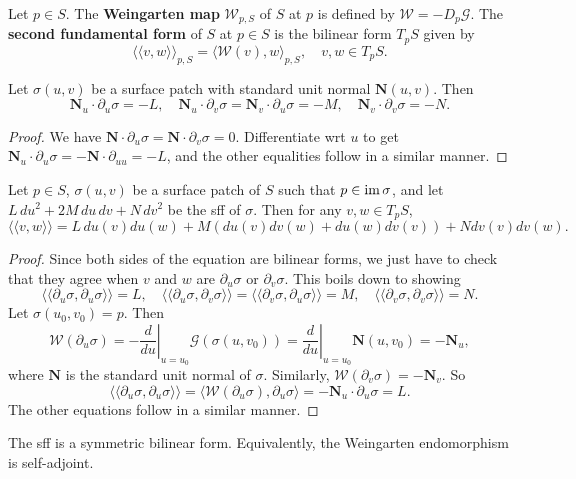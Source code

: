 \begin{definition}[]
    Let $p \in S$. The \textbf{Weingarten map} $\mathcal{W} _{p,S}$ of $S$ at $p$ is defined by $\mathcal{W}=-D_p \mathcal{G} $. The \textbf{second fundamental form} of $S$ at $p \in S$ is the bilinear form $T_p S$ given by \[
        \langle \langle v,w \rangle  \rangle _{p,S}=\langle \mathcal{W}(v),w \rangle  _{p,S}, \quad v,w  \in T_pS.
    \] 
\end{definition}
\begin{lemma}
    Let $\sigma(u,v)$ be a surface patch with standard unit normal $\mathbf N(u,v)$. Then \[
    \mathbf N_u \cdot \partial _u\sigma=-L,\quad \mathbf N_u \cdot \partial _v\sigma=\mathbf N_v \cdot \partial _u\sigma=-M,\quad \mathbf N_v \cdot \partial _v\sigma=-N.
    \] 
\end{lemma}
\begin{proof}
    We have $\mathbf N \cdot \partial _u\sigma =\mathbf N\cdot \partial _v\sigma=0$. Differentiate wrt $u$ to get $\mathbf N_u \cdot \partial _u\sigma = -\mathbf N \cdot \partial _{uu}=-L$, and the other equalities follow in a similar manner.
\end{proof}
\begin{prop}
    Let $p \in S$, $\sigma(u,v)$ be a surface patch of $S$ such that $p \in \operatorname{im} \sigma$, and let $L \,du^2+2M \,du\,dv+N\,dv^2$ be the sff of $\sigma$. Then for any $v,w \in T_p S$, \[
        \langle \langle v,w \rangle  \rangle =L\, du(v)du(w)+M(du(v)dv(w)+du(w)dv(v))+Ndv(v)dv(w).
    \] 
\end{prop}
\begin{proof}
    Since both sides of the equation are bilinear forms, we just have to check that they agree when $v$ and $w$ are $\partial _u\sigma$ or $\partial _v\sigma$. This boils down to showing \[
        \langle \langle \partial _u\sigma,\partial _u\sigma \rangle  \rangle =L,\quad \langle \langle \partial _u\sigma ,\partial _v\sigma \rangle  \rangle =\langle \langle \partial _v\sigma,\partial _u\sigma \rangle  \rangle =M,\quad \langle \langle \partial _v\sigma,\partial _v\sigma \rangle  \rangle =N.
    \] Let $\sigma(u_0,v_0)=p$. Then \[
    \mathcal{W} (\partial _u\sigma)= \left. -\frac{d}{du} \right| _{u=u_0} \mathcal{G} (\sigma(u,v_0))=\left. \frac{d}{du} \right| _{u=u_0}\mathbf N(u,v_0)=-\mathbf N_u,
        \] where $\mathbf N$ is the standard unit normal of $\sigma$. Similarly, $\mathcal{W} (\partial _v\sigma)=-\mathbf N_v$. So \[
        \langle \langle \partial _u\sigma,\partial _u\sigma \rangle  \rangle = \langle \mathcal{W} (\partial _u\sigma),\partial _u\sigma \rangle =-\mathbf N_u \cdot \partial _u\sigma=L.
        \] The other equations follow in a similar manner.
\end{proof}
\begin{cor}
    The sff is a symmetric bilinear form. Equivalently, the Weingarten endomorphism is self-adjoint.
\end{cor}

